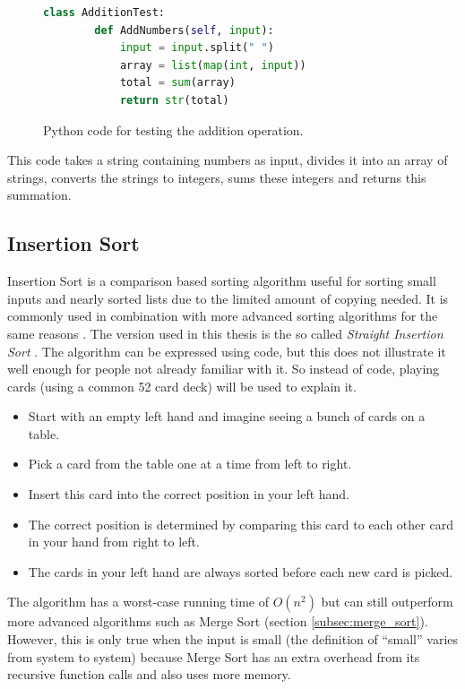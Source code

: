 \begin{figure}[h]
	\lstset{style=sharpc}
	\begin{lstlisting}[language=python]
	class AdditionTest:
	    def AddNumbers(self, input):
	        input = input.split(" ")
	        array = list(map(int, input))
	        total = sum(array)
	        return str(total)
	\end{lstlisting}
	\caption{Python code for testing the addition operation.}
	\label{fig:addition_test}
\end{figure}

This code takes a string containing numbers as input, divides it into an array of strings, converts the strings to integers, sums these integers and returns this summation.

\subsection{Insertion Sort}
Insertion Sort is a comparison based sorting algorithm useful for sorting small inputs and nearly sorted lists \cite{Cook} due to the limited amount of copying needed. It is commonly used in combination with more advanced sorting algorithms for the same reasons \cite{Musser}. The version used in this thesis is the so called \textit{Straight Insertion Sort} \cite{Castro}. The algorithm can be expressed using code, but this does not illustrate it well enough for people not already familiar with it. So instead of code, playing cards (using a common 52 card deck) will be used to explain it.

\begin{itemize}
\item Start with an empty left hand and imagine seeing a bunch of cards on a table.
\item Pick a card from the table one at a time from left to right.
\item Insert this card into the correct position in your left hand.
\item The correct position is determined by comparing this card to each other card in your hand from right to left.
\item The cards in your left hand are always sorted before each new card is picked.
\end{itemize}

The algorithm has a worst-case running time of $O(n^2)$ but can still outperform more advanced algorithms such as Merge Sort (section \ref{subsec:merge_sort}). However, this is only true when the input is small (the definition of ``small'' varies from system to system) \cite{Insertionsort} because Merge Sort has an extra overhead from its recursive function calls and also uses more memory.

